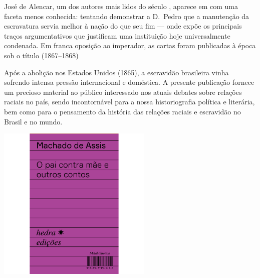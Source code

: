 \hspace*{-7cm}\hrulefill\hspace*{-7cm}

\medskip

\noindent{}José de Alencar, um dos autores mais lidos do século , aparece em {} com uma faceta menos conhecida: tentando demonstrar a D.~Pedro  que a manutenção da escravatura servia melhor à nação do que seu fim --- onde expõe os principais traços argumentativos que justificam uma instituição hoje universalmente condenada. 
Em franca oposição ao imperador, as cartas foram publicadas à época sob o título {} (1867--1868)

Após a abolição nos Estados Unidos (1865), a escravidão brasileira vinha sofrendo intensa pressão internacional e doméstica. A presente publicação fornece um precioso material ao público interessado nos atuais debates sobre relações raciais no país, sendo incontornável para a nossa historiografia política e literária, bem como para o pensamento da história das relações raciais e escravidão no Brasil e no mundo.

\vfill

\hspace*{-.4cm}\begin{minipage}[c]{.5\linewidth}
\small{
{}}
\end{minipage}

\pagebreak

\begin{center}
\hspace*{.5cm}\includegraphics[width=74mm]{./grid/machado.jpg}
\end{center}

